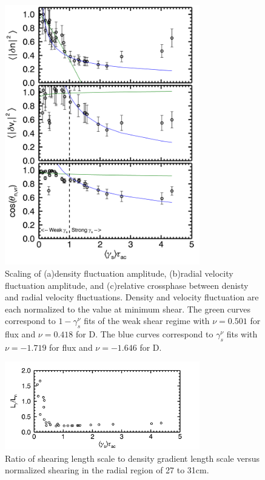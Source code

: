\documentclass[aip,pop,amsmath,amssymb,reprint,superscriptaddress]{revtex4-1} %
\begin{document}
\begin{figure}[!htbp]
\centerline{
\includegraphics[width=8.5cm]{densvrcp}}
\caption{\label{fig:densvrcp} Scaling of (a)density fluctuation amplitude, (b)radial velocity fluctuation amplitude, and (c)relative crossphase between denisty and radial velocity fluctuations. Density and velocity fluctuation are each normalized to the value at minimum shear. The green curves correspond to $1-\gamma_{s}^{\nu}$ fits of the weak shear regime with $\nu = 0.501$ for flux and $\nu = 0.418$ for D. The blue curves correspond to $\gamma_{s}^{\nu}$ fits with $\nu = -1.719$ for flux and $\nu = -1.646$ for D.}
\end{figure}

\begin{figure}[!htbp]
\centerline{
\includegraphics[width=8.5cm]{LgammaLn}}
\caption{\label{fig:LgammaLn} Ratio of shearing length scale to density gradient length scale versus normalized shearing in the radial region of 27 to 31cm.}
\end{figure}
\end{document}
